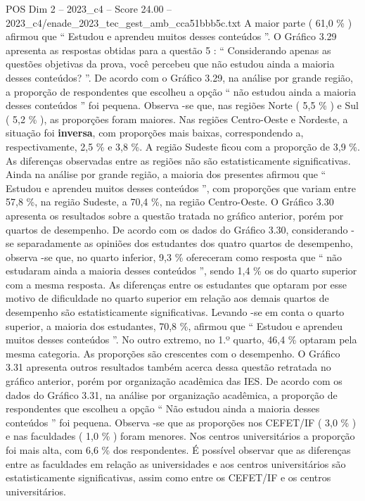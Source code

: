 \begin{textsample}{POS Dim 2 – 2023\_c4 – Score 24.00 – 2023\_c4/enade\_2023\_tec\_gest\_amb\_cca51bbb5c.txt}
A maior parte ( 61,0 \% ) afirmou que “ Estudou e aprendeu muitos desses conteúdos ”.
O Gráfico 3.29 apresenta as respostas obtidas para a questão 5 : “ Considerando apenas as questões objetivas da prova, você percebeu que não estudou ainda a maioria desses conteúdos? ”.
De acordo com o Gráfico 3.29, na análise por grande região, a proporção de respondentes que escolheu a opção “ não estudou ainda a maioria desses conteúdos ” foi pequena.
Observa -se que, nas regiões Norte ( 5,5 \% ) e Sul ( 5,2 \% ), as proporções foram maiores.
Nas regiões Centro-Oeste e Nordeste, a situação foi \textbf{inversa}, com proporções mais baixas, correspondendo a, respectivamente, 2,5 \% e 3,8 \%.
A região Sudeste ficou com a proporção de 3,9 \%.
As diferenças observadas entre as regiões não são estatisticamente significativas.
Ainda na análise por grande região, a maioria dos presentes afirmou que “ Estudou e aprendeu muitos desses conteúdos ”, com proporções que variam entre 57,8 \%, na região Sudeste, a 70,4 \%, na região Centro-Oeste.
O Gráfico 3.30 apresenta os resultados sobre a questão tratada no gráfico anterior, porém por quartos de desempenho.
De acordo com os dados do Gráfico 3.30, considerando -se separadamente as opiniões dos estudantes dos quatro quartos de desempenho, observa -se que, no quarto inferior, 9,3 \% ofereceram como resposta que “ não estudaram ainda a maioria desses conteúdos ”, sendo 1,4 \% os do quarto superior com a mesma resposta.
As diferenças entre os estudantes que optaram por esse motivo de dificuldade no quarto superior em relação aos demais quartos de desempenho são estatisticamente significativas.
Levando -se em conta o quarto superior, a maioria dos estudantes, 70,8 \%, afirmou que “ Estudou e aprendeu muitos desses conteúdos ”.
No outro extremo, no 1.º quarto, 46,4 \% optaram pela mesma categoria.
As proporções são crescentes com o desempenho.
O Gráfico 3.31 apresenta outros resultados também acerca dessa questão retratada no gráfico anterior, porém por organização acadêmica das IES.
De acordo com os dados do Gráfico 3.31, na análise por organização acadêmica, a proporção de respondentes que escolheu a opção “ Não estudou ainda a maioria desses conteúdos ” foi pequena.
Observa -se que as proporções nos CEFET/IF ( 3,0 \% ) e nas faculdades ( 1,0 \% ) foram menores.
Nos centros universitários a proporção foi mais alta, com 6,6 \% dos respondentes.
É possível observar que as diferenças entre as faculdades em relação as universidades e aos centros universitários são estatisticamente significativas, assim como entre os CEFET/IF e os centros universitários.

\end{textsample}
